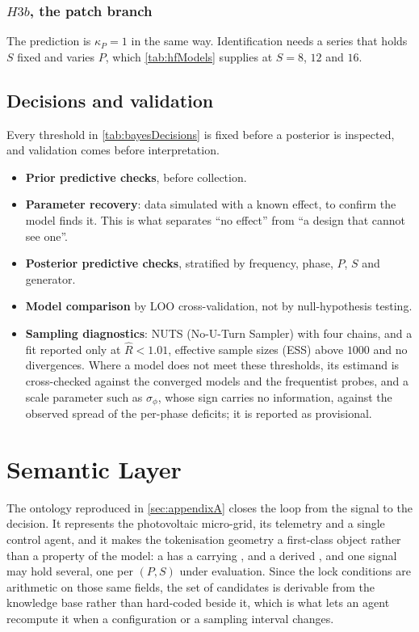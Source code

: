 \subsubsection{$H3b$, the patch branch}
The prediction is $\kappa_P=1$ in the same way. Identification needs a series that holds $S$ fixed and varies $P$, which \autoref{tab:hfModels} supplies at $S{=}8$, $12$ and $16$.

\subsection{Decisions and validation}
Every threshold in \autoref{tab:bayesDecisions} is fixed before a posterior is inspected, and validation comes before interpretation.

\begin{itemize}\setlength{\itemsep}{2pt}
    \item \textbf{Prior predictive checks}, before collection.
    \item \textbf{Parameter recovery}: data simulated with a known effect, to confirm the model finds it. This is what separates ``no effect'' from ``a design that cannot see one''.
    \item \textbf{Posterior predictive checks}, stratified by frequency, phase, $P$, $S$ and generator.
    \item \textbf{Model comparison} by LOO cross-validation, not by null-hypothesis testing.
    \item \textbf{Sampling diagnostics}: NUTS (No-U-Turn Sampler) with four chains, and a fit reported only at $\hat R<1.01$, effective sample sizes (ESS) above $1000$ and no divergences. Where a model does not meet these thresholds, its estimand is cross-checked against the converged models and the frequentist probes, and a scale parameter such as $\sigma_\phi$, whose sign carries no information, against the observed spread of the per-phase deficits; it is reported as provisional.
\end{itemize}



\section{Semantic Layer}
\label{sec:semantic}

The ontology reproduced in \autoref{sec:appendixA} closes the loop from the signal to the decision. It represents the photovoltaic micro-grid, its telemetry and a single control agent, and it makes the tokenisation geometry a first-class object rather than a property of the model: a  has a  carrying ,  and a derived , and one signal may hold several, one per $(P,S)$ under evaluation. Since the lock conditions are arithmetic on those same fields, the set of candidates is derivable from the knowledge base rather than hard-coded beside it, which is what lets an agent recompute it when a configuration or a sampling interval changes.

